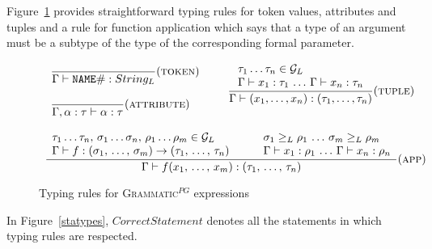 \documentclass{informat} %
\newcommand{\figref}[1]{Figure~\ref{#1}}
\newcommand{\ATF}{\textsc{Grammatic}$^{PG}$}
\begin{document}
\figref{exptypes} provides straightforward typing rules for token values, attributes and tuples and a rule for function application which says that a type of an argument must be a subtype of the type of the corresponding formal parameter.

\newcommand{\trule}[3]{%
\dfrac{#1}{#2}(\mbox{\textsc{#3}})
}

\begin{figure}[htbp]
$$\begin{array}{lll}

	\begin{array}{l}
		\trule{}{\Gamma \vdash \mathtt{NAME\#} : \Str}{token}\\
		\\
		\trule{}{\Gamma, \alpha : \tau \vdash \alpha : \tau }{attribute}\\
	\end{array}
&&
\trule{
\begin{array}{l}
	\tau_1 \ldots\tau_n \in \G\\
	\Gamma \vdash x_1 : \tau_1 \, \ldots \, \Gamma \vdash x_n : \tau_n
\end{array}
}{
	\Gamma \vdash (x_1, \ldots, x_n) : (\tau_1, \ldots, \tau_n)
}{tuple}

\\
&&\hspace{10pt}\\
\multicolumn{3}{c}{
\trule{	
\begin{array}{lll}
		\tau_1 \ldots\tau_n,\, \sigma_1 \ldots \sigma_n,\, \rho_1 \ldots \rho_m \in \G
		&\quad&
		\sigma_1 \gel \rho_1\,\ldots\, \sigma_m \gel \rho_m\\
		\Gamma \vdash f : (\sigma_1,\,\ldots,\,\sigma_m) \rightarrow (\tau_1,\,\ldots,\,\tau_n)
		&\quad&
		\Gamma \vdash x_1 : \rho_1 \, \ldots \, \Gamma \vdash x_n : \rho_n\\
\end{array}
}{\Gamma \vdash f(x_1,\,\ldots,\,x_m) : (\tau_1,\,\ldots,\,\tau_n)}{app}
}
\end{array}$$
\caption{Typing rules for \ATF{} expressions}\label{exptypes}
\end{figure}

In \figref{statypes}, $CorrectStatement$ denotes all the statements in which typing rules are respected. 
\end{document}
